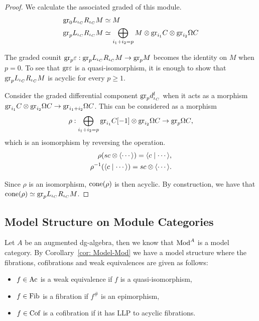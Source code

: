\documentclass[../thesis.tex]{subfiles}
\begin{document}
\begin{proof}
                We calculate the associated graded of this module.
                \begin{align*}
                    \tt{gr}_0L_{\iota_C}R_{\iota_C}M & \simeq M \\
                    \tt{gr}_pL_{\iota_C}R_{\iota_C}M & \simeq \bigoplus_{i_1 + i_2 = p} M \otimes \tt{gr}_{i_1}C \otimes \tt{gr}_{i_2}\Omega C
                \end{align*}

                The graded counit $\tt{gr}_p\varepsilon : \tt{gr}_pL_{\iota_C}R_{\iota_C}M \rightarrow \tt{gr}_pM$ becomes the identity on $M$ when $p = 0$. To see that $\tt{gr}\varepsilon$ is a quasi-isomorphism, it is enough to show that $\tt{gr}_pL_{\iota_C}R_{\iota_C}M$ is acyclic for every $p \geq 1$.

                Consider the graded differential component $\tt{gr}_pd^l_{\iota_C}$ when it acts as a morphism $\tt{gr}_{i_1}C \otimes \tt{gr}_{i_2}\Omega C \rightarrow \tt{gr}_{i_1+i_2}\Omega C$. This can be considered as a morphism 
                \begin{align*}
                    \rho : \bigoplus_{i_1 + i_2 = p} \tt{gr}_{i_1}C[-1] \otimes \tt{gr}_{i_2}\Omega C \rightarrow \tt{gr}_{p}\Omega C\tt{,}
                \end{align*}
                which is an isomorphism by reversing the operation.
                \begin{align*}
                    \rho (sc \otimes \langle \cdots \rangle) = \langle c \mid \cdots \rangle\tt{,} \\
                    \rho^{-1}(\langle c \mid \cdots \rangle) = sc \otimes \langle \cdots \rangle\tt{.}
                \end{align*}

                Since $\rho$ is an isomorphism, $\tt{cone}(\rho)$ is then acyclic. By construction, we have that \\ $\tt{cone}(\rho) \simeq \tt{gr}_pL_{\iota_C}R_{\iota_C}M$.

            \end{proof}

        \subsection{Model Structure on Module Categories}

            Let $A$ be an augmented dg-algebra, then we know that $\tt{Mod}^A$ is a model category. By Corollary~\ref{cor: Model-Mod} we have a model structure where the fibrations, cofibrations and weak equivalences are given as follows:
            \begin{itemize}
                \item $f\in \tt{Ac}$ is a weak equivalence if $f$ is a quasi-isomorphism,
                \item $f\in \tt{Fib}$ is a fibration if $f^\#$ is an epimorphism,
                \item $f\in \tt{Cof}$ is a cofibration if it has LLP to acyclic fibrations. 
            \end{itemize}
\end{document}
